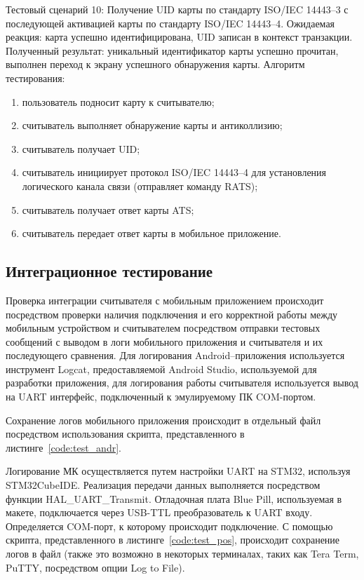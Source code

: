 Тестовый сценарий 10: Получение UID карты по стандарту ISO/IEC 14443--3 с последующей активацией карты по стандарту ISO/IEC 14443--4.
Ожидаемая реакция: карта успешно идентифицирована, UID записан в контекст транзакции.
Полученный результат: уникальный идентификатор карты успешно прочитан, выполнен переход к экрану успешного обнаружения карты.
Алгоритм тестирования:
\begin{enumerate}
	\item пользователь подносит карту к считывателю;
	\item считыватель выполняет обнаружение карты и антиколлизию;
	\item считыватель получает UID;
	\item считыватель инициирует протокол ISO/IEC 14443--4 для установления логического канала связи (отправляет команду RATS);
	\item считыватель получает ответ карты ATS;
	\item считыватель передает ответ карты в мобильное приложение.
\end{enumerate}


\subsection{Интеграционное тестирование}
\label{subsec:test_integr}

Проверка интеграции считывателя с мобильным приложением происходит посредством проверки наличия подключения и его корректной работы между мобильным устройством и считывателем посредством отправки тестовых сообщений с выводом в логи мобильного приложения и считывателя и их последующего сравнения.
Для логирования Android--приложения используется инструмент Logcat, предоставляемой Android Studio, используемой для разработки приложения, для логирования работы считывателя используется вывод на UART интерфейс, подключенный к эмулируемому ПК COM-портом.

Сохранение логов мобильного приложения происходит в отдельный файл посредством использования скрипта, представленного в листинге~\ref{code:test_andr}.

\begin{singlespacing}
	\small
	\captionsetup{labelsep=endash, justification=raggedright, singlelinecheck=off}
	
\end{singlespacing}

Логирование МК осуществляется путем настройки UART на STM32, используя STM32CubeIDE.
Реализация передачи данных выполняется посредством функции HAL\_UART\_Transmit.
Отладочная плата Blue Pill, используемая в макете, подключается через USB-TTL преобразователь к UART входу.
Определяется COM-порт, к которому происходит подключение.
С помощью скрипта, представленного в листинге~\ref{code:test_pos}, происходит сохранение логов в файл (также это возможно в некоторых терминалах, таких как Tera Term, PuTTY, посредством опции Log to File).

